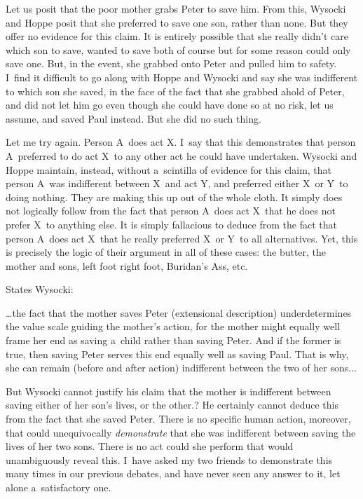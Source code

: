 Let us posit that the poor mother grabs Peter to save him. From this, Wysocki and Hoppe posit that she preferred to save one son, rather than none. But they offer no evidence for this claim. It is entirely possible that she really didn't care which son to save, wanted to save both of course but for some reason could only save one. But, in the event, she grabbed onto Peter and pulled him to safety. I~find it difficult to go along with Hoppe and Wysocki and say she was indifferent to which son she saved, in the face of the fact that she grabbed ahold of Peter, and did not let him go even though she could have done so at no risk, let us assume, and saved Paul instead. But she did no such thing.



Let me try again. Person A~does act X. I~say that this demonstrates that person A~preferred to do act X~to any other act he could have undertaken. Wysocki and Hoppe maintain, instead, without a~scintilla of evidence for this claim, that person A~was indifferent between X~and act Y, and preferred either X~or Y~to doing nothing. They are making this up out of the whole cloth. It simply does not logically follow from the fact that person A~does act X~that he does not prefer X~to anything else. It is simply fallacious to deduce from the fact that person A~does act X~that he really preferred X~or Y~to all alternatives. Yet, this is precisely the logic of their argument in all of these cases: the butter, the mother and sons, left foot right foot, Buridan's Ass, etc.



States Wysocki:



…the fact that the mother saves Peter (extensional description) underdetermines the value scale guiding the mother's action, for the mother might equally well frame her end as saving a~child rather than saving Peter. And if the former is true, then saving Peter serves this end equally well as saving Paul. That is why, she can remain (before and after action) indifferent between the two of her sons...



But Wysocki cannot justify his claim that the mother is indifferent between saving either of her son's lives, or the other.? He certainly cannot deduce this from the fact that she saved Peter. There is no specific human action, moreover, that could unequivocally \textit{demonstrate} that she was indifferent between saving the lives of her two sons. There is no act could she perform that would unambiguously reveal this. I~have asked my two friends to demonstrate this many times in our previous debates, and have never seen any answer to it, let alone a~satisfactory one.



